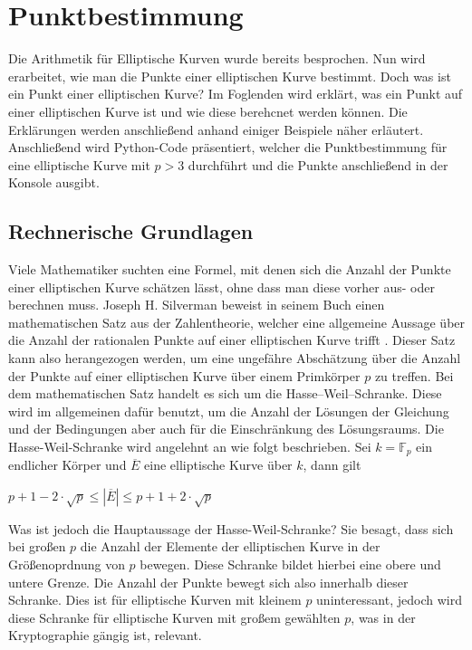  
\section{Punktbestimmung}
Die Arithmetik für Elliptische Kurven wurde bereits besprochen. Nun wird erarbeitet, wie man die Punkte einer elliptischen Kurve bestimmt. Doch was ist ein Punkt einer elliptischen Kurve? Im Foglenden wird erklärt, was ein Punkt auf einer elliptischen Kurve ist und wie diese berehcnet werden können. Die Erklärungen werden anschließend anhand einiger Beispiele näher erläutert. Anschließend wird Python-Code präsentiert, welcher die Punktbestimmung für eine elliptische Kurve mit $p > 3$ durchführt und die Punkte anschließend in der Konsole ausgibt.

\subsection{Rechnerische Grundlagen}
Viele Mathematiker suchten eine Formel, mit denen sich die Anzahl der Punkte einer elliptischen Kurve schätzen lässt, ohne dass man diese vorher aus- oder berechnen muss. Joseph H. Silverman beweist in seinem Buch einen mathematischen Satz aus der Zahlentheorie, welcher eine allgemeine Aussage über die Anzahl der rationalen Punkte auf einer elliptischen Kurve trifft \cite[S. 138]{JosephH.Silverman.2009}. Dieser Satz kann also herangezogen werden, um eine ungefähre Abschätzung über die Anzahl der Punkte auf einer elliptischen Kurve über einem Primkörper $p$ zu treffen. Bei dem mathematischen Satz handelt es sich um die Hasse–Weil–Schranke. Diese wird im allgemeinen dafür benutzt, um die Anzahl der Lösungen der Gleichung und der Bedingungen aber auch für die Einschränkung des Lösungsraums. Die Hasse-Weil-Schranke wird angelehnt an \cite[S. 181]{Dr.ReinholdHubl.2022} wie folgt beschrieben. Sei $k = \mathbb{F}_p$ ein endlicher Körper und $\overline{E}$ eine elliptische Kurve über $k$, dann gilt
\begin{center}
$p + 1 - 2 \cdot \sqrt{p} \leq | \overline{E} | \leq p + 1 + 2 \cdot \sqrt{p}$
\end{center} 

Was ist jedoch die Hauptaussage der Hasse-Weil-Schranke? Sie besagt, dass sich bei großen $p$ die Anzahl der Elemente der elliptischen Kurve in der Größenoprdnung von $p$ bewegen. Diese Schranke bildet hierbei eine obere und untere Grenze. Die Anzahl der Punkte bewegt sich also innerhalb dieser Schranke. Dies ist für elliptische Kurven mit kleinem $p$ uninteressant, jedoch wird diese Schranke für elliptische Kurven mit großem gewählten $p$, was in der Kryptographie gängig ist, relevant.\\


